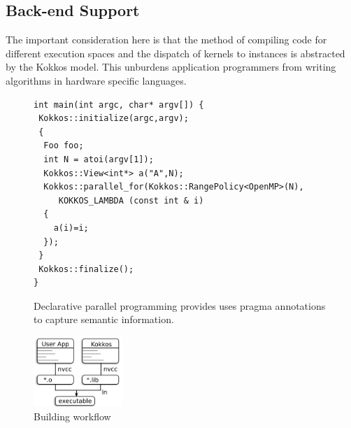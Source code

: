 \subsection{Back-end Support}\label{chap:kokkosBackend}




The important consideration here is that the method of compiling code for different execution spaces and the dispatch of kernels to instances is abstracted by the Kokkos model. This unburdens application programmers from writing algorithms in hardware specific languages.

\begin{figure}
\begin{Verbatim}[frame=leftline]
int main(int argc, char* argv[]) {
 Kokkos::initialize(argc,argv);
 {
  Foo foo;
  int N = atoi(argv[1]);
  Kokkos::View<int*> a("A",N);  
  Kokkos::parallel_for(Kokkos::RangePolicy<OpenMP>(N), 
     KOKKOS_LAMBDA (const int & i)
  {
  	a(i)=i;
  }); 
 }
 Kokkos::finalize();
}
\end{Verbatim}
\caption{Declarative parallel programming provides uses pragma annotations to capture semantic information.}
\label{figOMPLike}
\end{figure}


\begin{figure}
\centerline{\includegraphics[width=0.3\textwidth]{img/Build.png}}
\caption{Building workflow}
\label{fig}
\end{figure}